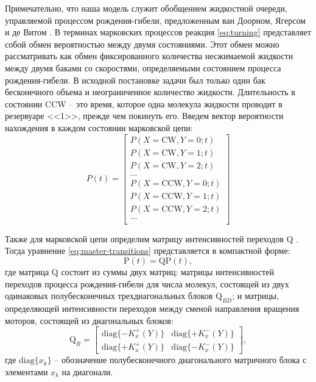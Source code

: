 Примечательно, что наша модель служит обобщением жидкостной очереди, управляемой процессом рождения-гибели, предложенным ван Доорном, Ягерсом и де Витом \cite{van_doom_fluid_1988}. В терминах марковских процессов реакция \cref{eq:turning} представляет собой обмен вероятностью между двумя состояниями. Этот обмен можно рассматривать как обмен фиксированного количества несжимаемой жидкости между двумя баками со скоростями, определяемыми состоянием процесса рождения-гибели. В исходной постановке задачи был только один бак бесконечного объема и неограниченное количество жидкости. Длительность в состоянии CCW -- это время, которое одна молекула жидкости проводит в резервуаре <<1>>, прежде чем покинуть его. Введем вектор вероятности нахождения в каждом состоянии марковской цепи: 
\begin{equation}
    P(t) = \begin{bmatrix}
    P(X = \mathrm{CW}, Y = 0; t)\\
    P(X = \mathrm{CW}, Y = 1; t)\\
    P(X = \mathrm{CW}, Y = 2; t)\\
    ...\\
    P(X = \mathrm{CCW}, Y = 0; t)\\
    P(X = \mathrm{CCW}, Y = 1; t)\\
    P(X = \mathrm{CCW}, Y = 2; t)\\
    ...\\
    \end{bmatrix}
\label{eq:state-probs}
\end{equation}

Также для марковской цепи определим матрицу интенсивностей переходов $\boldsymbol{\mathrm{Q}}$ \cite{kapmen_stochastic_1990}. Тогда уравнение \cref{eq:master-transitions} представляется в компактной форме: 
\begin{equation}
    \boldsymbol{\mathrm{P}}(t) = \boldsymbol{\mathrm{Q}} \boldsymbol{\mathrm{P}}(t),
    \label{eq:master-transitions-compact}
\end{equation}
где матрица $\boldsymbol{\mathrm{Q}}$ состоит из суммы двух матриц: матрицы интенсивностей переходов процесса рождения-гибели для числа молекул, состоящей из двух одинаковых полубесконечных трехдиагональных блоков $\boldsymbol{\mathrm{Q}}_{BD}$; и матрицы, определяющей интенсивности переходов между сменой направления вращения моторов, состоящей из диагональных блоков:
\begin{equation}
    \boldsymbol{\mathrm{Q}}_{R} = 
    \begin{bmatrix} \mathrm{diag}\{-K^+_x (Y)\}&\mathrm{diag}\{+K^-_x (Y)\}\\ \mathrm{diag}\{+K^+_x (Y)\}&\mathrm{diag}\{-K^-_x (Y) \} \end{bmatrix},
    \label{eq:transition-block}
\end{equation}
где $\mathrm{diag}\{x_k\}$ -- обозначение полубесконечного диагонального матричного блока с элементами $x_k$ на диагонали.

